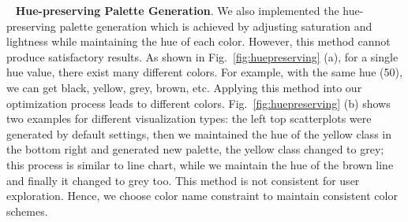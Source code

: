 \documentclass[review,onecolumn]{vgtc}                %
\newcommand{\myparagraph}[1]{\mbox{\ } \newline \noindent \textbf{#1}}
\renewcommand{\paragraph}[1]{\myparagraph{#1}}
\begin{document}
%
%


\paragraph{Hue-preserving Palette Generation}.
We also implemented the hue-preserving palette generation which is achieved by adjusting saturation and lightness while maintaining the hue of each color. However, this method cannot produce satisfactory results. As shown in Fig.~\ref{fig:huepreserving} (a), for a single hue value, there exist many different colors. For example, with the same hue (50), we can get black, yellow, grey, brown, etc. Applying this method into our optimization process leads to different colors. Fig.~\ref{fig:huepreserving} (b) shows two examples for different visualization types: the left top scatterplots were generated by default settings, then we maintained the hue of the yellow class in the bottom right and generated new palette, the yellow class changed to grey; this process is similar to line chart, while we maintain the hue of the brown line and finally it changed to grey too. This method is not consistent for user exploration. Hence, we choose color name constraint to maintain consistent color schemes.
\end{document}
